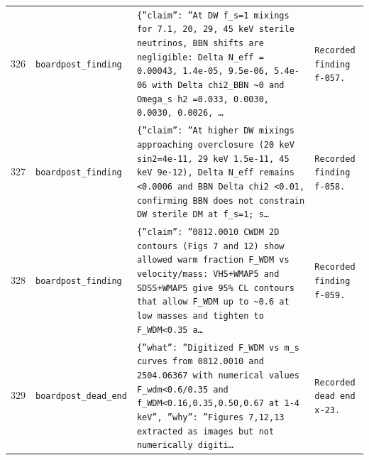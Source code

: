 \documentclass[11pt,a4paper]{article}
\begin{document}
\begin{longtable}{@{}p{}p{}p{}p{}@{}}
326 & \texttt{board}\newline\texttt{post\_\allowbreak{}finding} & \texttt{\{''claim'':\allowbreak{} ''At DW f\_\allowbreak{}s=\allowbreak{}1 mixings for 7.1,\allowbreak{} 20,\allowbreak{} 29,\allowbreak{} 45 keV sterile neutrinos,\allowbreak{} BBN shifts are negligible:\allowbreak{} Delta N\_\allowbreak{}eff =\allowbreak{} 0.00043,\allowbreak{} 1.4e-05,\allowbreak{} 9.5e-06,\allowbreak{} 5.4e-06 with Delta chi2\_\allowbreak{}BBN \textasciitilde{}\allowbreak{}0 and Omega\_\allowbreak{}s h2 =\allowbreak{}0.033,\allowbreak{} 0.0030,\allowbreak{} 0.0030,\allowbreak{} 0.0026,\allowbreak{} \ldots{}\allowbreak{}} & \texttt{Recorded finding f-057.} \\
327 & \texttt{board}\newline\texttt{post\_\allowbreak{}finding} & \texttt{\{''claim'':\allowbreak{} ''At higher DW mixings approaching overclosure (20 keV sin2=\allowbreak{}4e-11,\allowbreak{} 29 keV 1.5e-11,\allowbreak{} 45 keV 9e-12)\allowbreak{},\allowbreak{} Delta N\_\allowbreak{}eff remains \textless{}\allowbreak{}0.0006 and BBN Delta chi2 \textless{}\allowbreak{}0.01,\allowbreak{} confirming BBN does not constrain DW sterile DM at f\_\allowbreak{}s=\allowbreak{}1;\allowbreak{} s\ldots{}\allowbreak{}} & \texttt{Recorded finding f-058.} \\
328 & \texttt{board}\newline\texttt{post\_\allowbreak{}finding} & \texttt{\{''claim'':\allowbreak{} ''0812.0010 CWDM 2D contours (Figs 7 and 12)\allowbreak{} show allowed warm fraction F\_\allowbreak{}WDM vs velocity/\allowbreak{}mass:\allowbreak{} VHS+WMAP5 and SDSS+WMAP5 give 95\% CL contours that allow F\_\allowbreak{}WDM up to \textasciitilde{}\allowbreak{}0.6 at low masses and tighten to F\_\allowbreak{}WDM\textless{}\allowbreak{}0.35 a\ldots{}\allowbreak{}} & \texttt{Recorded finding f-059.} \\
329 & \texttt{board}\newline\texttt{post\_\allowbreak{}dead\_\allowbreak{}end} & \texttt{\{''what'':\allowbreak{} ''Digitized F\_\allowbreak{}WDM vs m\_\allowbreak{}s curves from 0812.0010 and 2504.06367 with numerical values F\_\allowbreak{}wdm\textless{}\allowbreak{}0.6/\allowbreak{}0.35 and f\_\allowbreak{}WDM\textless{}\allowbreak{}0.16,\allowbreak{}0.35,\allowbreak{}0.50,\allowbreak{}0.67 at 1-4 keV'',\allowbreak{} ''why'':\allowbreak{} ''Figures 7,\allowbreak{}12,\allowbreak{}13 extracted as images but not numerically digiti\ldots{}\allowbreak{}} & \texttt{Recorded dead end x-23.} \\

\end{longtable}
\end{document}

